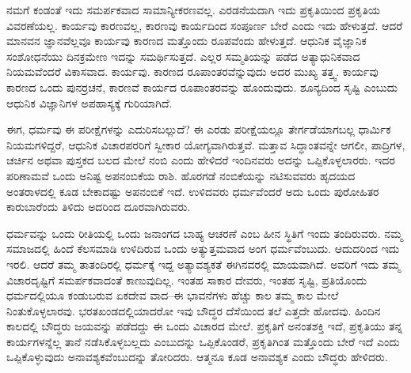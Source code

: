 \vskip 5pt

ನಮಗೆ ಕಂಡಂತೆ ಇದು ಸಮರ್ಪಕವಾದ ಸಾಮಾನ್ಯೀಕರಣವಲ್ಲ. ಎರಡನೆಯದಾಗಿ ಇದು ಪ್ರಕೃತಿಯಿಂದ ಪ್ರಕೃತಿಯ ವಿವರಣೆಯಲ್ಲ. ಕಾರ್ಯವು ಕಾರಣವಲ್ಲ, ಕಾರಣವು ಕಾರ್ಯದಿಂದ ಸಂಪೂರ್ಣ ಬೇರೆ ಎಂದು ಇದು ಹೇಳುತ್ತದೆ. ಆದರೆ ಮಾನವನ ಜ್ಞಾನವೆಲ್ಲವೂ ಕಾರ್ಯವು ಕಾರಣದ ಮತ್ತೊಂದು ರೂಪವೆಂದು ಹೇಳುತ್ತದೆ. ಆಧುನಿಕ ವೈಜ್ಞಾನಿಕ ಸಂಶೋಧನೆಯು ದಿನಕ್ರಮೇಣ ಇದನ್ನು ಸಮರ್ಥಿಸುತ್ತದೆ. ಎಲ್ಲರ ಸಮ್ಮತಿಯನ್ನು ಪಡೆದ ಅತ್ಯಾಧುನಿಕವಾದ ನಿಯಮವೆಂದರೆ ವಿಕಾಸವಾದ. ಕಾರ್ಯವು. ಕಾರಣದ ರೂಪಾಂತರವೆನ್ನುವುದು ಅದರ ಮುಖ್ಯ ತತ್ತ್ವ. ಕಾರ್ಯವು ಕಾರಣದ ಒಂದು ಪುನರ್ರಚನೆ, ಕಾರಣವೆ ಕಾರ್ಯದ ರೂಪಾಂತರವನ್ನು ಹೊಂದುವುದು. ಶೂನ್ಯದಿಂದ ಸೃಷ್ಟಿ ಎಂಬುದು ಆಧುನಿಕ ವಿಜ್ಞಾನಿಗಳ ಅಪಹಾಸ್ಯಕ್ಕೆ ಗುರಿಯಾಗಿದೆ. 

\vskip 5pt

ಈಗ, ಧರ್ಮವು ಈ ಪರೀಕ್ಷೆಗಳನ್ನು ಎದುರಿಸಬಲ್ಲುದೆ? ಈ ಎರಡು ಪರೀಕ್ಷೆಯಲ್ಲೂ ತೇರ್ಗಡೆಯಾಗಬಲ್ಲ ಧಾರ್ಮಿಕ ನಿಯಮಗಳಿದ್ದರೆ, ಆಧುನಿಕ ವಿಚಾರಪರರಿಗೆ ಸ್ವೀಕಾರ ಯೋಗ್ಯವಾಗಿರುತ್ತವೆ. ಮತ್ತಾವ ಸಿದ್ಧಾಂತವನ್ನೇ ಆಗಲೀ, ಪಾದ್ರಿಗಳ, ಚರ್ಚಿನ ಅಥವಾ ಪುಸ್ತಕದ ಬಲದ ಮೇಲೆ ನಂಬಿ ಎಂದು ಹೇಳಿದರೆ ಇಂದಿನವರು ಅದನ್ನು ಒಪ್ಪಿಕೊಳ್ಳಲಾರರು. ಇದರ ಪರಿಣಾಮವೆ ಒಂದು ಅನಿಷ್ಟ ಅಪನಂಬಿಕೆಯ ರಾಶಿ. ಹೊರಗಡೆ ನಂಬಿಕೆಯನ್ನು ನಟಿಸುವವರು ಹೃದಯದ ಅಂತರಾಳದಲ್ಲಿ ಕೂಡ ಬೇಕಾದಷ್ಟು ಅಪನಂಬಿಕೆ ಇದೆ. ಉಳಿದವರು ಧರ್ಮವೆಂದರೆ ಅದು ಒಂದು ಪುರೋಹಿತರ ಕಾರುಬಾರೆಂದು ತಿಳಿದು ಅದರಿಂದ ದೂರವಾಗಿರುವರು. 

\vskip 5pt

ಧರ್ಮವನ್ನು ಒಂದು ರೀತಿಯಲ್ಲಿ ಒಂದು ಜನಾಂಗದ ಬಾಹ್ಯ ಆಚರಣೆ ಎಂಬ ಹೀನ ಸ್ಥಿತಿಗೆ ಇಂದು ತಂದಿರುವರು. ನಮ್ಮ ಸಮಾಜದಲ್ಲಿ ಹಿಂದೆ ಕೆಲಸಮಾಡಿ ಉಳಿದಿರುವ ಒಂದು ಅತ್ಯುತ್ತಮವಾದ ಅಂಗ ಧರ್ಮವೆಂಬುದು. ಆದುದರಿಂದ ಇದು ಇರಲಿ. ಆದರೆ ತಮ್ಮ ತಾತಂದಿರಲ್ಲಿ ಧರ್ಮಕ್ಕೆ ಇದ್ದ ಅತ್ಯಾವಶ್ಯಕತೆ ಈಗಿನವರಲ್ಲಿ ಮಾಯವಾಗಿದೆ. ಅವರಿಗೆ ಇದು ತಮ್ಮ ವಿಚಾರದೃಷ್ಟಿಗೆ ಸಮರ್ಪಕವಾದಂತೆ ಕಾಣುವುದಿಲ್ಲ. ಇಂತಹ ಸಾಕಾರ ದೇವರು, ಇಂತಹ ಸೃಷ್ಟಿ, ಪ್ರತಿಯೊಂದು ಧರ್ಮದಲ್ಲಿಯೂ ಕಂಡುಬರುವ ಏಕದೇವ ವಾದ–ಈ ಭಾವನೆಗಳು ಹೆಚ್ಚು ಕಾಲ ತಮ್ಮ ಕಾಲ ಮೇಲೆ ನಿಂತುಕೊಳ್ಳಲಾರವು. ಭರತಖಂಡದಲ್ಲಿಯಾದರೋ ಇವು ಬೌದ್ಧರ ದೆಸೆಯಿಂದ ತಲೆ ಎತ್ತದೇ ಹೋದವು. ಹಿಂದಿನ ಕಾಲದಲ್ಲಿ ಬೌದ್ಧರು ಜಯವನ್ನು ಪಡೆದದ್ದು ಈ ಒಂದು ವಿಚಾರದ ಮೇಲೆ. ಪ್ರಕೃತಿಗೆ ಅನಂತಶಕ್ತಿ ಇದೆ, ಪ್ರಕೃತಿಯು ತನ್ನ ಕಾರ್ಯಗಳನ್ನೆಲ್ಲ ತಾನೆ ನಡೆಸಿಕೊಳ್ಳಬಲ್ಲದು ಎಂಬುದನ್ನು ಒಪ್ಪಿಕೊಂಡರೆ, ಪ್ರಕೃತಿಗಿಂತ ಮತ್ತೊಂದು ಬೇರೆ ಇದೆ ಎಂದು ಒಪ್ಪಿಕೊಳ್ಳುವುದು ಅನಾವಶ್ಯಕವೆಂಬುದನ್ನು ತೋರಿದರು. ಆತ್ಮನೂ ಕೂಡ ಅನಾವಶ್ಯಕ ಎಂದು ಬೌದ್ಧರು ಹೇಳಿದರು. 

\vskip 5pt

